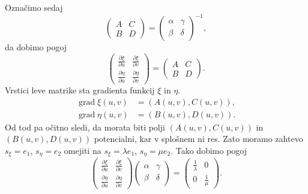 Označimo sedaj \begin{equation*}
\begin{pmatrix}
A & C \\
B & D
\end{pmatrix} = \begin{pmatrix}
  \alpha & \gamma \\ \beta & \delta
  \end{pmatrix}^{-1},
\end{equation*}  
da dobimo pogoj 
\begin{equation*}
  \begin{pmatrix}
    \frac{ \partial \xi }{ \partial u }  & \frac{ \partial \xi }{ \partial v }  \\
    \frac{ \partial \eta }{ \partial u }  & \frac{ \partial \eta }{ \partial v } 
    \end{pmatrix} = \begin{pmatrix}
      A & C \\
      B & D
      \end{pmatrix}.
\end{equation*}  
Vrstici leve matrike sta gradienta funkcij $\xi$ in $\eta$.\begin{align*}
    \operatorname{grad} \xi (u,v) &= (A(u,v), C(u,v)), \\
    \operatorname{grad} \eta (u,v) &= (B(u,v), D(u,v)).
\end{align*}
Od tod pa očitno sledi, da morata biti polji $(A(u,v), C(u,v))$ in $(B(u,v), D(u,v))$ potencialni, kar v splošnem ni res.
Zato moramo zahtevo $s_{\xi} = e_1$, $s_{\eta} = e_2$ omejiti na $s_{\xi} = \lambda e_1$, $s_{\eta} = \mu e_2$.
Tako dobimo pogoj \begin{equation*}
  \begin{pmatrix}
    \frac{ \partial \xi }{ \partial u }  & \frac{ \partial \xi }{ \partial v }  \\
    \frac{ \partial \eta }{ \partial u }  & \frac{ \partial \eta }{ \partial v } 
    \end{pmatrix} \begin{pmatrix}
      \alpha & \gamma \\ \beta & \delta
      \end{pmatrix} = \begin{pmatrix}
        \frac{1}{\lambda} & 0  \\ 0 & \frac{1}{\mu}
        \end{pmatrix}.
\end{equation*}  

